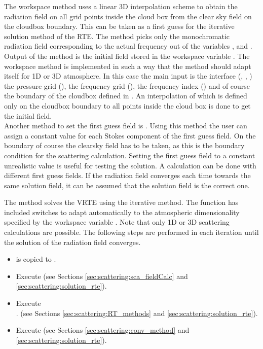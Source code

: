 The workspace method  uses a linear 3D
interpolation scheme to obtain the radiation field on all grid points
inside the cloud box from the clear sky field on the cloudbox
boundary.  This can be taken as a first guess for the iterative
solution method of the RTE.  The method picks only the monochromatic
radiation field corresponding to the actual frequency out of the
variables ,  and
. Output of the method is the initial field
stored in the workspace variable .  The workspace
method  is implemented in such a way
that the method should adapt itself for 1D or 3D atmosphere. In this
case the main input is the interface (,
, ) the pressure grid
(), the frequency grid (), the
frequency index () and of course the
boundary of the cloudbox defined in .  An
interpolation of  which is defined only on the
cloudbox boundary to all points inside the cloud box is
done to get the initial field. \\

\vspace*{1ex} Another method to set the first guess field is
. Using this method the user can assign a
constant value for each Stokes component of the first guess field. On
the boundary of course the clearsky field has to be taken, as this is
the boundary condition for the scattering calculation.  Setting the
first guess field to a constant unrealistic value is useful for
testing the solution. A calculation can be done with different first
guess fields. If the radiation field converges each time towards the
same solution field, it can be assumed that the solution field is the
correct one.


The method  solves the VRTE using the
iterative method.  The function has included switches to adapt
automatically to the atmospheric dimensionality specified by the
workspace variable . Note that only 1D or 3D
scattering calculations are possible.  The following steps are
performed in each iteration until the solution of the radiation field
converges.

\begin{itemize}
\item {} is copied to .
\item Execute  (see Sections
  \ref{sec:scattering:sca_fieldCalc} and
  \ref{sec:scattering:solution_rte}).
\item Execute\\
  .  (see
  Sections \ref{sec:scattering:RT_methods} and
  \ref{sec:scattering:solution_rte}).
\item Execute  (see Sections
  \ref{sec:scattering:conv_method} and
  \ref{sec:scattering:solution_rte}).
\end{itemize}

